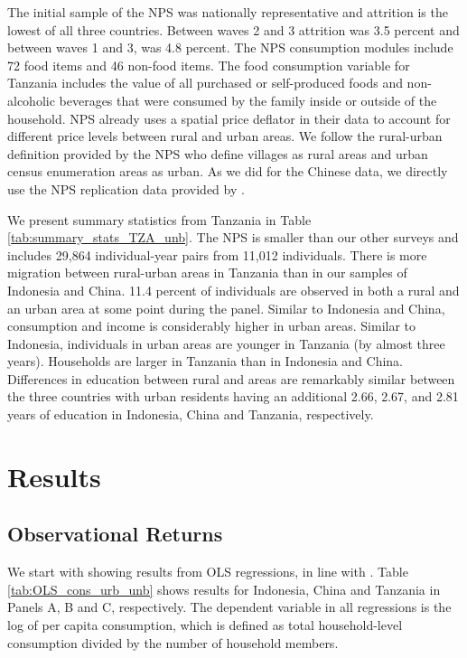 \documentclass[12pt]{article}
\begin{document}
The initial sample of the NPS was nationally representative and attrition is the lowest of all three countries.  Between waves 2 and 3 attrition was 3.5 percent and between waves 1 and 3, was 4.8 percent. The NPS consumption modules include 72 food items and 46 non-food items.
The food consumption variable for Tanzania includes the value of all purchased or self-produced foods and non-alcoholic beverages that were consumed by the family inside or outside of the household. NPS already uses a spatial price deflator in their data to account for different price levels between rural and urban areas. 
We follow the rural-urban definition provided by the NPS who define villages as rural areas and urban census enumeration areas as urban.
As we did for the Chinese data, we directly use the NPS replication data provided by \cite{lagakosMigrationCostsObservational2020}.



We present summary statistics from Tanzania in Table \ref{tab:summary_stats_TZA_unb}. The NPS is smaller than our other surveys and includes 29,864 individual-year pairs from 11,012 individuals. There is more migration between rural-urban areas in Tanzania than in our samples of Indonesia and China. 11.4 percent of individuals are observed in both a rural and an urban area at some point during the panel.  Similar to Indonesia and China, consumption and income is considerably higher in urban areas. Similar to Indonesia, individuals in urban areas are younger in Tanzania (by almost three years). Households are larger in Tanzania than in Indonesia and China. Differences in education between rural and areas are remarkably similar between the three countries with urban residents having an additional 2.66, 2.67, and 2.81 years of education in Indonesia, China and Tanzania, respectively.





\section{Results}\label{sec:results}

\subsection{Observational Returns}\label{sec:observational-returns}

We start with showing results from OLS regressions, in line with 
\cite{hamoryReevaluatingAgriculturalProductivity2021}. 
Table \ref{tab:OLS_cons_urb_unb} shows results for Indonesia, China and Tanzania in Panels A, B and C, respectively. 
The dependent variable in all regressions is the log of per capita consumption, which is defined as total household-level consumption divided by the number of household members. 
\end{document}
